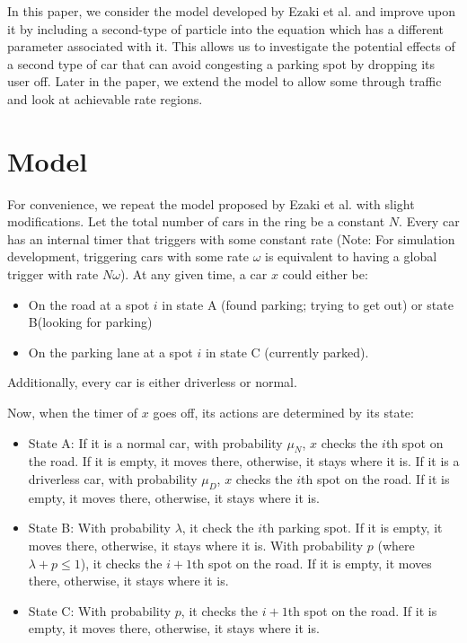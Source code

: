 \documentclass[]{article}
\begin{document}
In this paper, we consider the model developed by Ezaki et al. \cite{adsorption} and improve upon it by including a second-type of particle into the equation which has a different parameter associated with it. This allows us to investigate the potential effects of a second type of car that can avoid congesting a parking spot by dropping its user off. Later in the paper, we extend the model to allow some through traffic and look at achievable rate regions.


\section*{Model}

For convenience, we repeat the model proposed by Ezaki et al. \cite{adsorption} with slight modifications. 
Let the total number of cars in the ring be a constant $N$.
Every car has an internal timer that triggers with some constant rate (Note: For simulation development, triggering cars with some rate $\omega$ is equivalent to having a global trigger with rate $N\omega$). At any given time, a car $x$ could either be:
\begin{itemize}
\item On the road at a spot $i$ in state A (found parking; trying to get out) or state B(looking for parking) 
\item On the parking lane at a spot $i$ in state C (currently parked).
\end{itemize}

Additionally, every car is either driverless or normal.

Now, when the timer of $x$ goes off, its actions are determined by its state:
\begin{itemize}
	\item State A: If it is a normal car, with probability $\mu_N$, $x$ checks the $i$th spot on the road. If it is empty, it moves there, otherwise, it stays where it is. If it is a driverless car, with probability $\mu_D$, $x$ checks the $i$th spot on the road. If it is empty, it moves there, otherwise, it stays where it is.  
	\item State B: With probability $\lambda$, it check the $i$th parking spot. If it is empty, it moves there, otherwise, it stays where it is.  With probability $p$ (where $\lambda + p \leq 1$), it checks the $i+1$th spot on the road. If it is empty, it moves there, otherwise, it stays where it is.   
	\item State C: With probability $p$, it checks the $i+1$th spot on the road. If it is empty, it moves there, otherwise, it stays where it is.   
\end{itemize}
\end{document}
